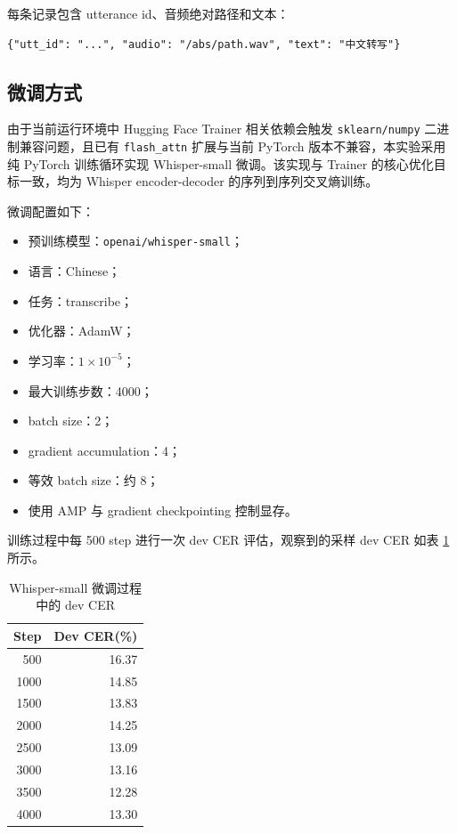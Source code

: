 \documentclass[UTF8,a4paper,12pt]{ctexart}
\begin{document}
每条记录包含 utterance id、音频绝对路径和文本：

\begin{lstlisting}
{"utt_id": "...", "audio": "/abs/path.wav", "text": "中文转写"}
\end{lstlisting}

\subsection{微调方式}

由于当前运行环境中 Hugging Face Trainer 相关依赖会触发 \texttt{sklearn/numpy} 二进制兼容问题，且已有 \texttt{flash\_attn} 扩展与当前 PyTorch 版本不兼容，本实验采用纯 PyTorch 训练循环实现 Whisper-small 微调。该实现与 Trainer 的核心优化目标一致，均为 Whisper encoder-decoder 的序列到序列交叉熵训练。

微调配置如下：

\begin{itemize}
  \item 预训练模型：\texttt{openai/whisper-small}；
  \item 语言：Chinese；
  \item 任务：transcribe；
  \item 优化器：AdamW；
  \item 学习率：$1\times10^{-5}$；
  \item 最大训练步数：4000；
  \item batch size：2；
  \item gradient accumulation：4；
  \item 等效 batch size：约 8；
  \item 使用 AMP 与 gradient checkpointing 控制显存。
\end{itemize}

训练过程中每 500 step 进行一次 dev CER 评估，观察到的采样 dev CER 如表 \ref{tab:whisper-train-curve} 所示。

\begin{table}[htbp]
  \centering
  \caption{Whisper-small 微调过程中的 dev CER}
  \label{tab:whisper-train-curve}
  \begin{tabular}{rr}
    \toprule
    Step & Dev CER(\%) \\
    \midrule
    500 & 16.37 \\
    1000 & 14.85 \\
    1500 & 13.83 \\
    2000 & 14.25 \\
    2500 & 13.09 \\
    3000 & 13.16 \\
    3500 & 12.28 \\
    4000 & 13.30 \\
    \bottomrule
  \end{tabular}
\end{table}
\end{document}
